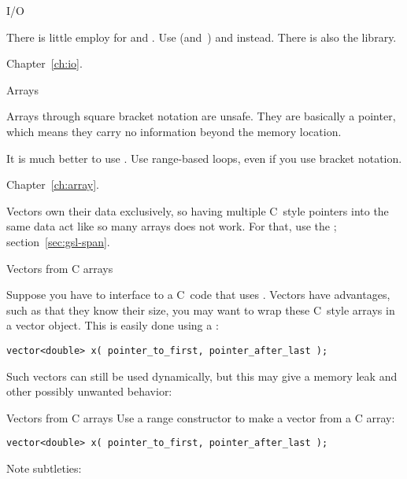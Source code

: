 
 {I/O}

There is little employ for  and
. Use  (and~)
and  instead. There is also the  library.

Chapter~\ref{ch:io}.

 {Arrays}

Arrays through square bracket notation are unsafe. They are basically
a pointer, which means they carry no information beyond the memory location.

It is much better
to use . Use range-based loops, even if you use
bracket notation.

Chapter~\ref{ch:array}.

Vectors own their data exclusively, so having multiple C~style pointers into
the same data act like so many arrays does not work. For that, use the
; section~\ref{sec:gsl-span}.

 {Vectors from C arrays}

Suppose you have to interface to a C~code that uses
.  Vectors have advantages, such as that they know
their size, you may want to wrap these C~style arrays in a vector
object. This is easily done using a :
\begin{lstlisting}
vector<double> x( pointer_to_first, pointer_after_last );
\end{lstlisting}

Such vectors can still be used dynamically, but this may give a memory
leak and other possibly unwanted behavior:


\begin{slide}{Vectors from C arrays}
  \label{sl:cvector}
  Use a range constructor to make a vector from a C array:
\begin{lstlisting}
vector<double> x( pointer_to_first, pointer_after_last );
\end{lstlisting}
Note subtleties:
%
\end{slide}

